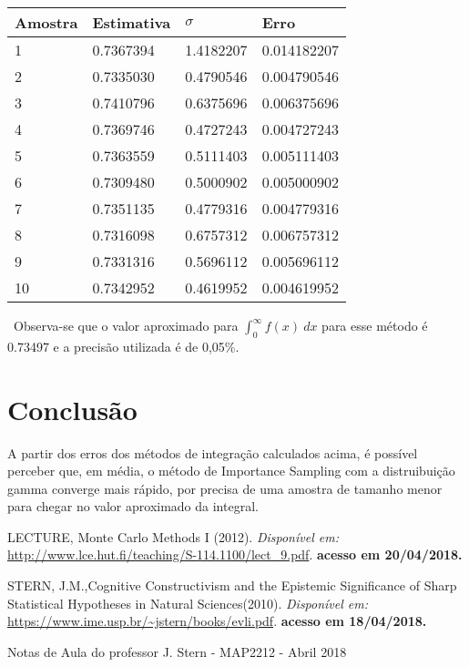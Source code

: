 \documentclass{article} %
\begin{document}
\begin{center}
\begin{tabular}{llll}
\hline
Amostra & Estimativa & $\sigma$ & Erro \\
\hline
1 & 0.7367394 & 1.4182207 & 0.014182207\\
2 & 0.7335030 & 0.4790546 & 0.004790546\\
3 & 0.7410796 & 0.6375696 & 0.006375696\\
4 & 0.7369746 & 0.4727243 & 0.004727243\\
5 & 0.7363559 & 0.5111403 & 0.005111403\\
6 & 0.7309480 & 0.5000902 & 0.005000902\\
7 & 0.7351135 & 0.4779316 & 0.004779316\\
8 & 0.7316098 & 0.6757312 & 0.006757312\\
9 & 0.7331316 & 0.5696112 & 0.005696112\\
10 & 0.7342952 & 0.4619952 & 0.004619952\\
\hline
\end{tabular}
\end{center}

\ Observa-se que o valor aproximado para $\int_{0}^{\infty} f(x) \ dx$ para esse método é  0.73497 e a precisão utilizada é de 0,05\%.

\section{Conclusão}

\qquad A partir dos erros dos métodos de integração calculados acima, é possível perceber que, em média, o método de Importance Sampling com a distruibuição gamma converge mais rápido, por precisa de uma amostra de tamanho menor para chegar no valor aproximado da integral.

\begin{thebibliography}{refs} %
        LECTURE, Monte Carlo Methods I (2012).
        \textit{Disponível em:}
        \url{http://www.lce.hut.fi/teaching/S-114.1100/lect_9.pdf}.
        \textbf {acesso em 20/04/2018.}
        
        STERN, J.M.,Cognitive Constructivism and the Epistemic Significance of Sharp Statistical Hypotheses in Natural Sciences(2010).
        \textit{Disponível em:}
        \url{https://www.ime.usp.br/~jstern/books/evli.pdf}.
        \textbf {acesso em 18/04/2018.}
        
        Notas de Aula do professor J. Stern - MAP2212 - Abril 2018       
\end{thebibliography}
\end{document}
